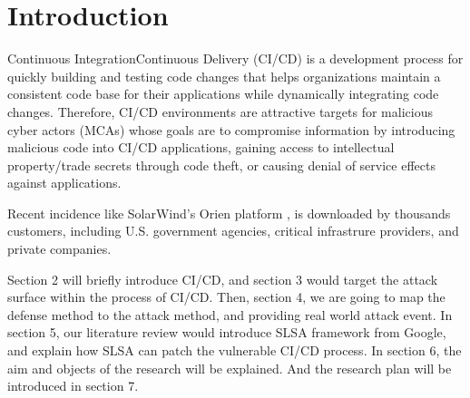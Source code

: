 \section{Introduction}
Continuous Integration\/Continuous Delivery (CI/CD) is a development
process for quickly building and testing code changes that helps 
organizations maintain a consistent code base for their applications 
while dynamically integrating code changes. Therefore, CI/CD environments 
are attractive targets for malicious cyber actors (MCAs) whose goals are 
to compromise information by introducing malicious code into CI/CD 
applications, gaining access to intellectual property/trade secrets 
through code theft, or causing denial of service effects against applications.

Recent incidence like SolarWind's Orien platform \cite{peisert2021perspectives}, \cite{ladisa2023sok} is downloaded
by thousands customers, including U.S. government agencies, critical infrastrure
providers, and private companies. 
 
Section 2 will briefly introduce CI/CD, and section 3 would target the attack
surface within the process of CI/CD. Then, section 4, we are going to map the 
defense method to the attack method, and providing real world attack event.
In section 5, our literature review would introduce SLSA framework from Google,
and explain how SLSA can patch the vulnerable CI/CD process. In section 6, the
aim and objects of the research will be explained. And the research plan will be 
introduced in section 7. 


